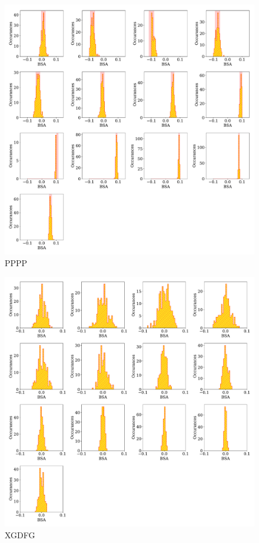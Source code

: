 \begin{figure}
  \begin{center}
    \includegraphics[width=\columnwidth]{image/subsets.pdf}
    \caption{PPPP}
  \end{center}
\end{figure}

\begin{figure}
  \begin{center}
    \includegraphics[width=\columnwidth]{image/helicity.pdf}
    \caption{XGDFG}
  \end{center}
\end{figure}

